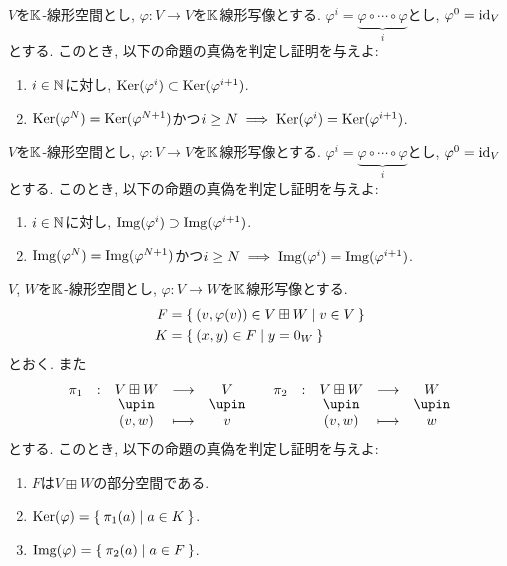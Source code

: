 \begin{quiz}
  $V$を$\mathbb{K}$-線形空間とし,
  $\varphi\colon V\to V$を$\mathbb{K}$線形写像とする.
  $\varphi^{i}=\underbrace{\varphi\circ\cdots\circ\varphi}_{i}$とし,
  $\varphi^{0}=\operatorname{id}_V$とする.
  このとき,
  以下の命題の真偽を判定し証明を与えよ:
  \begin{enumerate}
    \item $i\in\mathbb{N}$に対し, $\operatorname{Ker}(\varphi^i)\subset \operatorname{Ker}(\varphi^{i+1})$.
    \item $\operatorname{Ker}(\varphi^N) =\operatorname{Ker}(\varphi^{N+1})$かつ$i\geq N\implies \operatorname{Ker}(\varphi^i) =\operatorname{Ker}(\varphi^{i+1})$.
  \end{enumerate}
\end{quiz}

\begin{quiz}
  $V$を$\mathbb{K}$-線形空間とし,
  $\varphi\colon V\to V$を$\mathbb{K}$線形写像とする.
  $\varphi^{i}=\underbrace{\varphi\circ\cdots\circ\varphi}_{i}$とし,
  $\varphi^{0}=\operatorname{id}_V$とする.
  このとき,
  以下の命題の真偽を判定し証明を与えよ:
  \begin{enumerate}
    \item $i\in\mathbb{N}$に対し, $\operatorname{Img}(\varphi^i)\supset \operatorname{Img}(\varphi^{i+1})$.
    \item $\operatorname{Img}(\varphi^N) =\operatorname{Img}(\varphi^{N+1})$かつ$i\geq N\implies \operatorname{Img}(\varphi^i) =\operatorname{Img}(\varphi^{i+1})$.
  \end{enumerate}
\end{quiz}


\begin{quiz}
  $V$, $W$を$\mathbb{K}$-線形空間とし,
  $\varphi\colon V\to W$を$\mathbb{K}$線形写像とする.
  \begin{align*}
    F&=\Set{(v,\varphi(v))\in V\boxplus W| v\in V }\\
    K&=\Set{(x,y) \in F | y=0_W}
  \end{align*}
  とおく.
  また
  \begin{align*}
    \shazo{\pi_1}{V\boxplus W}{V}
          {(v,w)}{v}
          &&
    \shazo{\pi_2}{V\boxplus W}{W}
          {(v,w)}{w}
  \end{align*}
  とする.
  このとき,
  以下の命題の真偽を判定し証明を与えよ:
  \begin{enumerate}
  \item
    $F$は$V\boxplus W$の部分空間である.
  \item
    $\operatorname{Ker}(\varphi)=\Set{\pi_1(a) | a\in K}$.
  \item
    $\operatorname{Img}(\varphi)=\Set{\pi_2(a) | a\in F}$.
  \end{enumerate}
\end{quiz}

